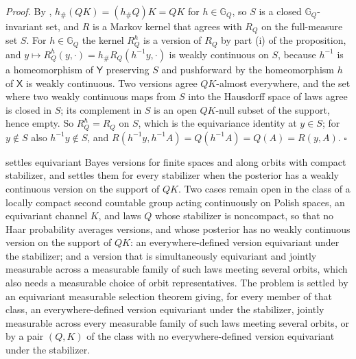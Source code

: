\noindent\emph{Proof.}
By , $h_\#(QK)=(h_\#Q)K=QK$ for $h\in\mathbb G_Q$, so $S$ is a
closed $\mathbb G_Q$-invariant set, and $R$ is a Markov kernel that agrees with $R_Q$ on the full-measure
set $S$. For $h\in\mathbb G_Q$ the kernel $R_Q^h$ is a version of $R_Q$ by part (i) of the proposition,
and $y\mapsto R_Q^h(y,\cdot)=h_\#R_Q(h^{-1}y,\cdot)$ is weakly continuous on $S$, because $h^{-1}$ is a
homeomorphism of $\mathsf Y$ preserving $S$ and pushforward by the homeomorphism $h$ of $\mathsf X$ is
weakly continuous. Two versions agree $QK$-almost everywhere, and the set where two weakly continuous
maps from $S$ into the Hausdorff space of laws agree is closed in $S$; its complement in $S$ is an open
$QK$-null subset of the support, hence empty. So $R_Q^h=R_Q$ on $S$, which is the equivariance identity
at $y\in S$; for $y\notin S$ also $h^{-1}y\notin S$, and $R(h^{-1}y,h^{-1}A)=Q(h^{-1}A)=Q(A)=R(y,A)$.
$\square$

 settles equivariant Bayes versions for finite spaces and
along orbits with compact stabilizer, and  settles them for
every stabilizer when the posterior has a weakly continuous version on the support of $QK$. Two cases
remain open in the class of a locally compact second countable group acting continuously on Polish
spaces, an equivariant channel $K$, and laws $Q$ whose stabilizer is noncompact, so that no Haar
probability averages versions, and whose posterior has no weakly continuous version on the support of
$QK$: an everywhere-defined version equivariant under the stabilizer; and a version that is
simultaneously equivariant and jointly measurable across a measurable family of such laws meeting
several orbits, which also needs a measurable choice of orbit representatives. The problem is settled
by an equivariant measurable selection theorem giving, for every member of that class, an
everywhere-defined version equivariant under the stabilizer, jointly measurable across every measurable
family of such laws meeting several orbits, or by a pair $(Q,K)$ of the class with no everywhere-defined
version equivariant under the stabilizer.

